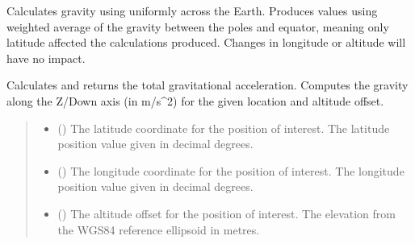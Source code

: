 \documentclass[letterpaper,10pt,english]{sphinxmanual}
\begin{document}
\begin{fulllineitems}
\label{\detokenize{modules/gravity/simple:qnav.gravity.simple.SimpleUniform}}
\pysigstartsignatures
{}
\pysigstopsignatures
\sphinxAtStartPar
Calculates gravity using uniformly across the Earth.
Produces values using weighted average of the gravity between the poles
and equator, meaning only latitude affected the calculations produced.
Changes in longitude or altitude will have no impact.

\begin{fulllineitems}
\label{\detokenize{modules/gravity/simple:qnav.gravity.simple.SimpleUniform.calc_gravity_z}}
\pysigstartsignatures
{}
\pysigstopsignatures
\sphinxAtStartPar
Calculates and returns the total gravitational acceleration.
Computes the gravity along the Z/Down axis (in m/s\textasciicircum{}2) for
the given location and altitude offset.
\begin{quote}\begin{description}
\begin{itemize}
\item {} 
\sphinxAtStartPar
{} () \textendash{} The latitude coordinate for the position of interest.
The latitude position value given in decimal degrees.

\item {} 
\sphinxAtStartPar
{} () \textendash{} The longitude coordinate for the position of interest.
The longitude position value given in decimal degrees.

\item {} 
\sphinxAtStartPar
{} () \textendash{} The altitude offset for the position of interest.
The elevation from the WGS\sphinxhyphen{}84 reference ellipsoid in metres.


\end{itemize}
\end{description}
\end{quote}
\end{fulllineitems}
\end{fulllineitems}
\end{document}
